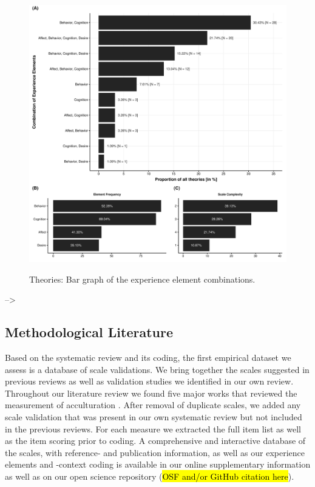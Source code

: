 \begin{figure}[h]
\centering
\caption{Theories: Bar graph of the experience element combinations.}
\includegraphics[width=\textwidth]{Figures/TheoriesFreq-1}
\label{fig:ElementsTheories}
\end{figure}



--\textgreater{}

\subsection{Methodological Literature}

Based on the systematic review and its coding, the first empirical
dataset we assess is a database of scale validations. We bring together
the scales suggested in previous reviews as well as validation studies
we identified in our own review. Throughout our literature review we
found five major works that reviewed the measurement of acculturation
\citep{Celenk2011, Maestas2000, Matsudaira2006, Wallace2010, Zane2004}.
After removal of duplicate scales, we added any scale validation that
was present in our own systematic review but not included in the
previous reviews. For each measure we extracted the full item list as
well as the item scoring prior to coding. A comprehensive and
interactive database of the scales, with reference- and publication
information, as well as our experience elements and -context coding is
available in our online supplementary information as well as on our open
science repository (\hl{OSF and/or GitHub citation here}).

